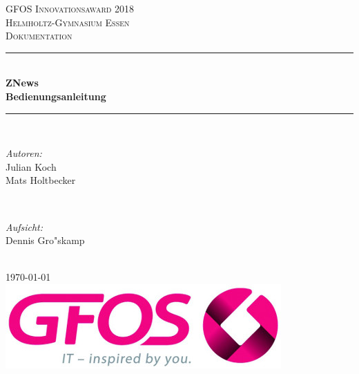     \begin{titlepage}

        \newcommand{\HRule}{\rule{\linewidth}{0.5mm}} %

        \center %

        \textsc{\LARGE GFOS Innovationsaward 2018}\\[1.5cm]
        \textsc{\Large Helmholtz-Gymnasium Essen}\\[0.5cm]
        \textsc{\large Dokumentation}\\[0.5cm]

        \HRule \\[0.4cm]
        { \huge \bfseries ZNews\\ Bedienungsanleitung}\\[0.4cm]
        \HRule \\[1.5cm]

        \begin{minipage}{0.4\textwidth}
            \begin{flushleft}
                \large
                \emph{Autoren:}\\
                Julian Koch\\
                Mats Holtbecker
            \end{flushleft}
        \end{minipage}
        ~
        \begin{minipage}{0.4\textwidth}
            \begin{flushright}
                \large
                \emph{Aufsicht:} \\
                Dennis Gro"skamp\\
                \hfill %
            \end{flushright}
        \end{minipage}\\[2cm]


        {\large \today}\\[2cm]

        \includegraphics[scale=0.7]{../gfos_logo_edited.jpg}\\[1cm] %


\end{titlepage}
